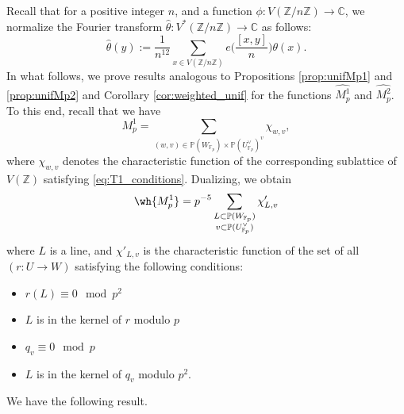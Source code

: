 \documentclass{article}
\def\Z{{\mathbb Z}}
\def\P{{\mathbb P}}
\def\F{{\mathbb F}}
\def\Z{{\mathbb Z}}
\def\P{{\mathbb P}}
\def\F{{\mathbb F}}
\def\C{{\mathbb C}}
\begin{document}
Recall that for a positive integer $n$, and a function $\phi:V(\Z/n\Z)\to\C$, we normalize the Fourier transform $\widehat{\theta}:V^*(\Z/n\Z)\to\C$ as follows:
\begin{equation*}
\widehat{\theta}(y):=\frac{1}{n^{12}}\sum_{x\in V(\Z/n\Z)}e\Big(\frac{[ x,y]}{n}\Big)\theta(x).
\end{equation*}
In what follows, we prove results analogous to Propositions \ref{prop:unifMp1} and \ref{prop:unifMp2} and Corollary \ref{cor:weighted_unif} for the functions $\widehat{M_p^1}$ and $\widehat{M_p^2}$. To this end, recall that we have
\begin{equation*}
M_p^1 = 
\sum_{(w,v)\in \P(W_{\F_p})\times \P(U^{\vee}_{\F_p})^v}\chi_{w,v},
\end{equation*}
where $\chi_{w,v}$ denotes the characteristic function of the corresponding sublattice of $V(\Z)$ satisfying \eqref{eq:T1_conditions}.
Dualizing, we obtain
\begin{equation}\label{eq:Mp1hateq}
\wh{M_p^1} = 
p^{-5}\sum_{\substack{L\subset \P(W_{\F_p})\\ v\subset \P(U_{\F_p}^\vee)}}\chi'_{L,v}    
\end{equation}
where  $L$ is a line, and $\chi'_{L,v}$ is the characteristic function of the set of all $(r:U\to W)$ satisfying the following conditions:
\begin{itemize}
\item[{\rm (1)}] $r(L)\equiv 0\mod p^2$
\item[{\rm (2)}] $L$ is in the kernel of $r$ modulo $p$
\item[{\rm (3)}] $q_v\equiv 0\mod p$
\item[{\rm (4)}] $L$ is in the kernel of $q_v$ modulo $p^2$.
\end{itemize}
We have the following result.
\end{document}
